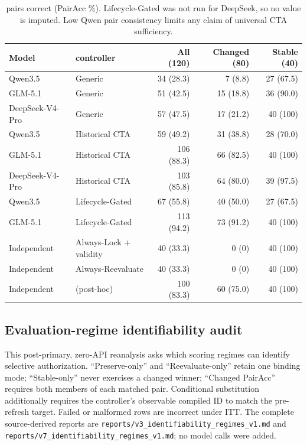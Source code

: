 \documentclass[10pt]{article}
\begin{document}
\begin{table}[h]
\centering
\scriptsize
\setlength{\tabcolsep}{3pt}
\begin{tabular}{llrrr}
\toprule
Model & \NewSchemaReplication{} controller & All (120) & Changed (80) & Stable (40) \\
\midrule
Qwen3.5 & Generic & 34 (28.3) & 7 (8.8) & 27 (67.5) \\
GLM-5.1 & Generic & 51 (42.5) & 15 (18.8) & 36 (90.0) \\
DeepSeek-V4-Pro & Generic & 57 (47.5) & 17 (21.2) & 40 (100) \\
Qwen3.5 & Historical CTA & 59 (49.2) & 31 (38.8) & 28 (70.0) \\
GLM-5.1 & Historical CTA & 106 (88.3) & 66 (82.5) & 40 (100) \\
DeepSeek-V4-Pro & Historical CTA & 103 (85.8) & 64 (80.0) & 39 (97.5) \\
Qwen3.5 & Lifecycle-Gated & 67 (55.8) & 40 (50.0) & 27 (67.5) \\
GLM-5.1 & Lifecycle-Gated & 113 (94.2) & 73 (91.2) & 40 (100) \\
Independent & Always-Lock + validity & 40 (33.3) & 0 (0) & 40 (100) \\
Independent & Always-Reevaluate & 40 (33.3) & 0 (0) & 40 (100) \\
Independent & \RuleStar{} (post-hoc) & 100 (83.3) & 60 (75.0) & 40 (100) \\
\bottomrule
\end{tabular}
\caption{\NewSchemaReplication{} pairs correct (PairAcc \%). Lifecycle-Gated was not run for DeepSeek, so no value
is imputed. Low Qwen pair consistency limits any claim of universal CTA sufficiency.}
\end{table}

\subsection{Evaluation-regime identifiability audit}
This post-primary, zero-API reanalysis asks which scoring regimes can identify selective
authorization. ``Preserve-only'' and ``Reevaluate-only'' retain one binding mode; ``Stable-only''
never exercises a changed winner; ``Changed PairAcc'' requires both members of each matched pair.
Conditional substitution additionally requires the controller's observable compiled ID to match the
pre-refresh target. Failed or malformed rows are incorrect under ITT. The complete source-derived
reports are \texttt{reports/v3\_identifiability\_regimes\_v1.md} and
\texttt{reports/v7\_identifiability\_regimes\_v1.md}; no model calls were added.
\end{document}
